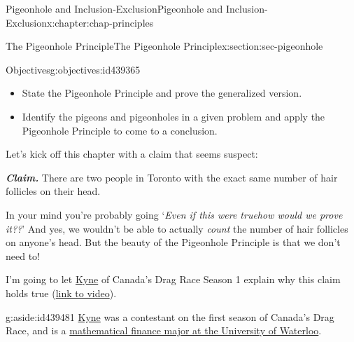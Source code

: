 \documentclass[oneside,10pt,]{book}
\newcommand{\alert}[1]{\textbf{\textit{#1}}}
\numberwithin{equation}{section}
\newlength{\qrsize}
\newlength{\previewwidth}
\begin{document}
\begin{chapterptx}{Pigeonhole and Inclusion-Exclusion}{}{Pigeonhole and Inclusion-Exclusion}{}{}{x:chapter:chap-principles}
%
%
\typeout{************************************************}
\typeout{************************************************}
%
\begin{sectionptx}{The Pigeonhole Principle}{}{The Pigeonhole Principle}{}{}{x:section:sec-pigeonhole}
\begin{objectives}{Objectives}{g:objectives:id439365}
%
\begin{itemize}[label=\textbullet]
\item{}State the Pigeonhole Principle and prove the generalized version.%
\item{}Identify the pigeons and pigeonholes in a given problem and apply the Pigeonhole Principle to come to a conclusion.%
\end{itemize}
\end{objectives}
Let's kick off this chapter with a claim that seems suspect:%
\par
\alert{Claim.} There are two people in Toronto with the exact same number of hair follicles on their head.%
\par
In your mind you're probably going `\emph{Even if this were true\textellipsis{}how would we prove it??}' And yes, we wouldn't be able to actually \emph{count} the number of hair follicles on anyone's head. But the beauty of the Pigeonhole Principle is that we don't need to!%
\par
I'm going to let \href{https://twitter.com/onlinekyne}{Kyne} of Canada's Drag Race Season 1 explain why this claim holds true (\href{https://www.tiktok.com/@onlinekyne/video/6825323353256070406}{link to video}).%
\begin{aside}{}{g:aside:id439481}%
\href{https://www.onlinekyne.com/}{Kyne} was a contestant on the first season of Canada's Drag Race, and is a \href{https://uwaterloo.ca/stories/mathematics/university-waterloos-math-student-vying-become-canadas-first}{mathematical finance major at the University of Waterloo}.%
\end{aside}
\begin{sidebyside}{1}{0.1}{0.1}{0}%
\begin{sbspanel}{0.8}%
\setlength{\qrsize}{7.2em}
\setlength{\previewwidth}{\linewidth}
\addtolength{\previewwidth}{-\qrsize}
\begin{tcbraster}[raster columns=2, raster column skip=1pt, raster halign=center, raster force size=false, raster left skip=0pt, raster right skip=0pt]%

\end{tcbraster}
\end{sbspanel}
\end{sidebyside}
\end{sectionptx}
\end{chapterptx}
\end{document}
